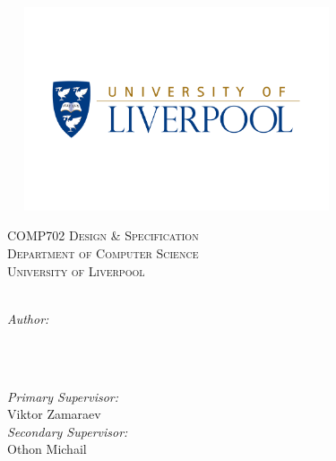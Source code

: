 \begin{titlepage}
\center
\makeatletter %

\includegraphics[height=6cm,width=10cm]{images/logo.png}

\textsc{\LARGE COMP702 Design \& Specification}\\[0.5cm]
\textsc{\large Department of Computer Science}\\[0.5cm]
\textsc{\large University of Liverpool}\\[1.5cm]
\textsc{\huge \@title}\\[3cm]

\begin{minipage}{0.4\textwidth}
    \begin{flushleft} \large
    \emph{Author:}\\
    \@author\\
    \studentno
    \end{flushleft}
\end{minipage}
~
\begin{minipage}{0.4\textwidth}
    \begin{flushright} \large
    \emph{Primary Supervisor:} \\
    Viktor Zamaraev\\[0.5cm]
    \emph{Secondary Supervisor:} \\
    Othon Michail
    \end{flushright}
\end{minipage}\\[2cm]


\textsc{\@date}

\makeatother
\vfill
\end{titlepage}